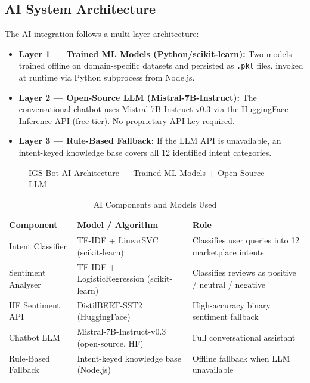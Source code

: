 \subsection{AI System Architecture}

The AI integration follows a multi-layer architecture:

\begin{itemize}
  \item \textbf{Layer 1 — Trained ML Models (Python/scikit-learn):} Two models trained offline on domain-specific datasets and persisted as \texttt{.pkl} files, invoked at runtime via Python subprocess from Node.js.
  \item \textbf{Layer 2 — Open-Source LLM (Mistral-7B-Instruct):} The conversational chatbot uses Mistral-7B-Instruct-v0.3 via the HuggingFace Inference API (free tier). No proprietary API key required.
  \item \textbf{Layer 3 — Rule-Based Fallback:} If the LLM API is unavailable, an intent-keyed knowledge base covers all 12 identified intent categories.
\end{itemize}

\begin{figure}[H]
\centering
\resizebox{\textwidth}{!}{}
\caption{IGS Bot AI Architecture --- Trained ML Models + Open-Source LLM}
\label{fig:sprint6_arch}
\end{figure}

\begin{table}[H]
\centering
\caption{AI Components and Models Used}
\begin{tabular}{L{3.5cm} L{4.5cm} L{5.5cm}}
\toprule
\textbf{Component}       & \textbf{Model / Algorithm}                    & \textbf{Role} \\
\midrule
Intent Classifier        & TF-IDF + LinearSVC (scikit-learn)             & Classifies user queries into 12 marketplace intents \\
Sentiment Analyser       & TF-IDF + LogisticRegression (scikit-learn)    & Classifies reviews as positive / neutral / negative \\
HF Sentiment API         & DistilBERT-SST2 (HuggingFace)                & High-accuracy binary sentiment fallback \\
Chatbot LLM              & Mistral-7B-Instruct-v0.3 (open-source, HF)   & Full conversational assistant \\
Rule-Based Fallback      & Intent-keyed knowledge base (Node.js)         & Offline fallback when LLM unavailable \\
\bottomrule
\end{tabular}
\end{table}

